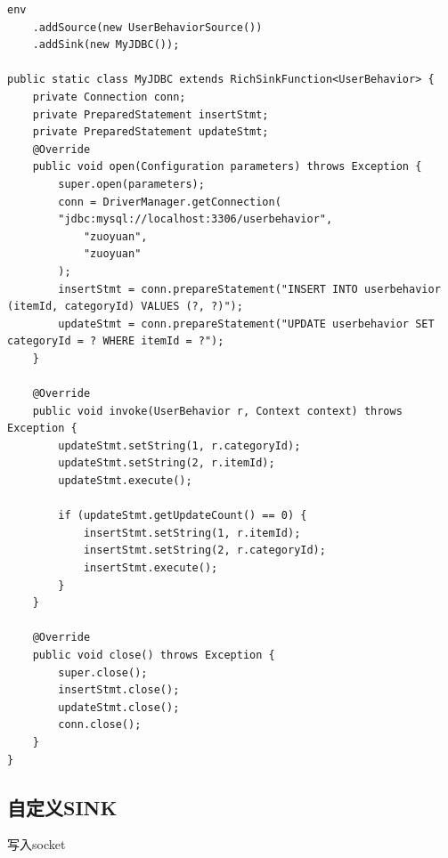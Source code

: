\documentclass[cn,11pt,chinese]{elegantbook}
\begin{document}
\begin{verbatim}
env
    .addSource(new UserBehaviorSource())
    .addSink(new MyJDBC());
    
public static class MyJDBC extends RichSinkFunction<UserBehavior> {
    private Connection conn;
    private PreparedStatement insertStmt;
    private PreparedStatement updateStmt;
    @Override
    public void open(Configuration parameters) throws Exception {
        super.open(parameters);
        conn = DriverManager.getConnection(
        "jdbc:mysql://localhost:3306/userbehavior",
            "zuoyuan",
            "zuoyuan"
        );
        insertStmt = conn.prepareStatement("INSERT INTO userbehavior (itemId, categoryId) VALUES (?, ?)");
        updateStmt = conn.prepareStatement("UPDATE userbehavior SET categoryId = ? WHERE itemId = ?");
    }
    
    @Override
    public void invoke(UserBehavior r, Context context) throws Exception {
        updateStmt.setString(1, r.categoryId);
        updateStmt.setString(2, r.itemId);
        updateStmt.execute();
        
        if (updateStmt.getUpdateCount() == 0) {
            insertStmt.setString(1, r.itemId);
            insertStmt.setString(2, r.categoryId);
            insertStmt.execute();
        }
    }
    
    @Override
    public void close() throws Exception {
        super.close();
        insertStmt.close();
        updateStmt.close();
        conn.close();
    }
}
\end{verbatim}

\subsection{自定义SINK}

写入socket
\end{document}
